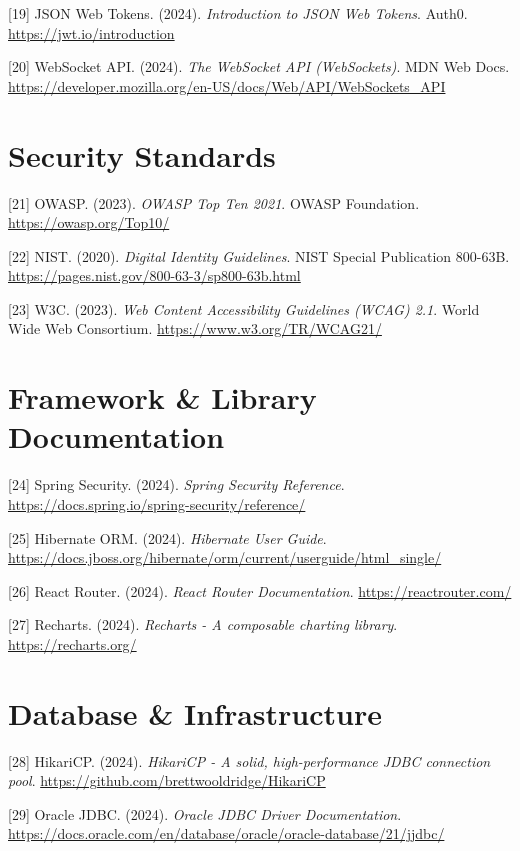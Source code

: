 \documentclass[
  12pt,
  a4paperpaper,
]{report}
\begin{document}
{[}19{]} JSON Web Tokens. (2024). \emph{Introduction to JSON Web
Tokens}. Auth0. \url{https://jwt.io/introduction}

{[}20{]} WebSocket API. (2024). \emph{The WebSocket API (WebSockets)}.
MDN Web Docs.
\url{https://developer.mozilla.org/en-US/docs/Web/API/WebSockets_API}


\section{Security Standards}\label{security-standards}

{[}21{]} OWASP. (2023). \emph{OWASP Top Ten 2021}. OWASP Foundation.
\url{https://owasp.org/Top10/}

{[}22{]} NIST. (2020). \emph{Digital Identity Guidelines}. NIST Special
Publication 800-63B. \url{https://pages.nist.gov/800-63-3/sp800-63b.html}

{[}23{]} W3C. (2023). \emph{Web Content Accessibility Guidelines (WCAG)
2.1}. World Wide Web Consortium. \url{https://www.w3.org/TR/WCAG21/}


\section{Framework \& Library
Documentation}\label{framework-library-documentation}

{[}24{]} Spring Security. (2024). \emph{Spring Security Reference}.
\url{https://docs.spring.io/spring-security/reference/}

{[}25{]} Hibernate ORM. (2024). \emph{Hibernate User Guide}.
\url{https://docs.jboss.org/hibernate/orm/current/userguide/html_single/}

{[}26{]} React Router. (2024). \emph{React Router Documentation}.
\url{https://reactrouter.com/}

{[}27{]} Recharts. (2024). \emph{Recharts - A composable charting
library}. \url{https://recharts.org/}


\section{Database \& Infrastructure}\label{database-infrastructure-1}

{[}28{]} HikariCP. (2024). \emph{HikariCP - A solid, high-performance
JDBC connection pool}. \url{https://github.com/brettwooldridge/HikariCP}

{[}29{]} Oracle JDBC. (2024). \emph{Oracle JDBC Driver Documentation}.
\url{https://docs.oracle.com/en/database/oracle/oracle-database/21/jjdbc/}
\end{document}
